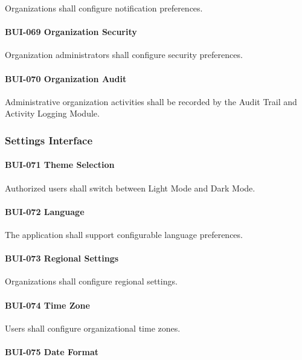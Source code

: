 Organizations shall configure notification preferences.

\paragraph{BUI-069 Organization Security}

Organization administrators shall configure security preferences.

\paragraph{BUI-070 Organization Audit}

Administrative organization activities shall be recorded by the Audit
Trail and Activity Logging Module.


\subsubsection*{Settings Interface}

\paragraph{BUI-071 Theme Selection}

Authorized users shall switch between Light Mode and Dark Mode.

\paragraph{BUI-072 Language}

The application shall support configurable language preferences.

\paragraph{BUI-073 Regional Settings}

Organizations shall configure regional settings.

\paragraph{BUI-074 Time Zone}

Users shall configure organizational time zones.

\paragraph{BUI-075 Date Format}

